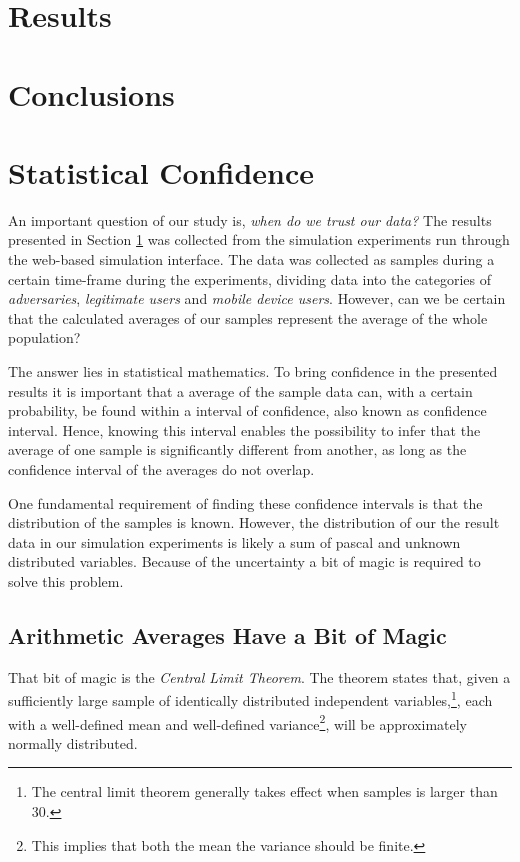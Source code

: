 \documentclass[a4paper,11pt]{kth-mag}
\begin{document}
\section{Results}\label{result}

\section{Conclusions}
 

\appendix
\appendixpage


\section{Statistical Confidence}\label{tab:confidence}
An important question of our study is, \emph{when do we trust our data?} The results presented in Section \ref{result} was collected from the simulation experiments run through the web-based simulation interface. The data was collected as samples during a certain time-frame during the experiments, dividing data into the categories of \emph{adversaries}, \emph{legitimate users} and \emph{mobile device users}. However,  can we be certain that the calculated averages of our samples represent the average of the whole population?

The answer lies in statistical mathematics. To bring confidence in the presented results it is important that a average of the sample data can, with a certain probability, be found within a interval of confidence, also known as confidence interval. Hence, knowing this interval enables the possibility to infer that the average of one sample is significantly different from another, as long as the confidence interval of the averages do not overlap.

One fundamental requirement of finding these confidence intervals is that the distribution of the samples is known. However, the distribution of our the result data in our simulation experiments is likely a sum of pascal and unknown distributed variables. Because of the uncertainty a bit of magic is required to solve this problem. 

\subsection{Arithmetic Averages Have a Bit of Magic}
That bit of magic is the \emph{Central Limit Theorem}. The theorem states that, given a sufficiently large sample of identically distributed independent variables,\footnote{The central limit theorem generally takes effect when samples is larger than 30.}, each with a well-defined mean and well-defined variance\footnote{This implies that both the mean the variance should be finite.}, will be approximately normally distributed\cite{gunnar}.
\end{document}
